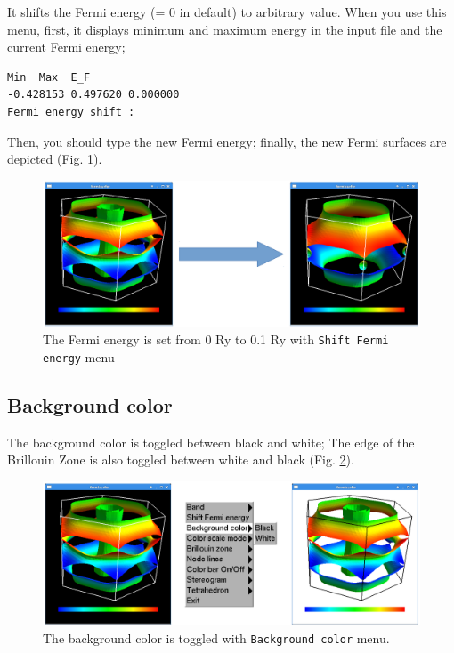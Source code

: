 \documentclass[12pt]{article}
\begin{document}
It shifts the Fermi energy (= 0 in default) to arbitrary value.
When you use this menu, 
first, it displays minimum and maximum energy in the input file
and the current Fermi energy;
\begin{verbatim}
Min  Max  E_F 
-0.428153 0.497620 0.000000 
Fermi energy shift : 
\end{verbatim}
Then, you should type the new Fermi energy;
finally, the new Fermi surfaces are depicted (Fig. \ref{fig_shift}).

\begin{figure}[!ht]
  \includegraphics[width=17cm]{figs/shift.eps}
  \caption{The Fermi energy is set from 0 Ry to 0.1 Ry 
    with \texttt{Shift Fermi energy} menu}
  \label{fig_shift}
\end{figure}

\subsection{Background color}

The background color is toggled between black and white;
The edge of the Brillouin Zone is also toggled 
between white and black (Fig. \ref{fig_background}). 

\begin{figure}[!ht]
  \includegraphics[width=17cm]{figs/background.eps}
  \caption{The background color is toggled with \texttt{Background color} menu.}
  \label{fig_background}
\end{figure}
\end{document}
